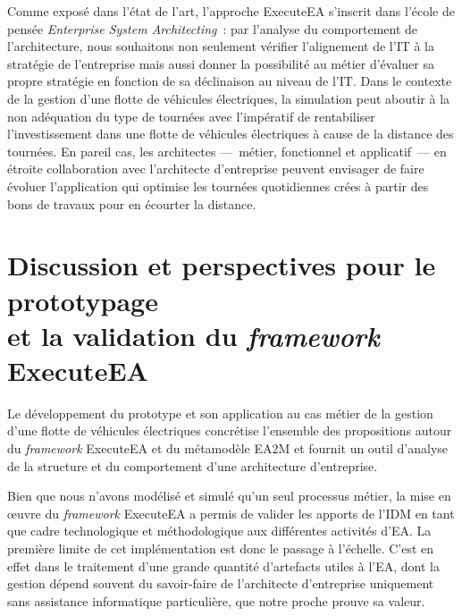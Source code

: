 Comme exposé dans l'état de l'art, l'approche ExecuteEA s'inscrit dans l'école
de pensée \emph{Enterprise System Architecting}~: par l'analyse du comportement
de l'architecture, nous souhaitons non seulement vérifier l'alignement de l'IT à
la stratégie de l'entreprise mais aussi donner la possibilité au métier
d'évaluer sa propre stratégie en fonction de sa déclinaison au niveau de l'IT.
Dans le contexte de la gestion d'une flotte de véhicules électriques, la
simulation peut aboutir à la non adéquation du type de tournées avec l'impératif
de rentabiliser l'investissement dans une flotte de véhicules électriques à
cause de la distance des tournées. En pareil cas, les architectes —~métier,
fonctionnel et applicatif~— en étroite collaboration avec l'architecte
d'entreprise peuvent envisager de faire évoluer l'application qui optimise les tournées quotidiennes 
crées à partir des bons de travaux pour en écourter la distance.




 
%

\section[Discussion et perspectives]{Discussion et perspectives pour le prototypage\\
            et la validation du \emph{framework} ExecuteEA}

    Le développement du prototype et son application au cas métier
    de la gestion d'une flotte de véhicules électriques concrétise l'ensemble des
    propositions autour du \emph{framework} ExecuteEA et du métamodèle EA2M
    et fournit un outil d'analyse de la structure et du comportement
    d'une architecture d'entreprise.

    Bien que nous n'avons modélisé et simulé qu'un seul processus métier, la mise
    en œuvre du \emph{framework} ExecuteEA a permis de valider les apports de l'IDM
    en tant que cadre technologique et méthodologique aux différentes activités d'EA.
    La première limite de cet implémentation est donc le passage à l'échelle. C'est en effet dans le
    traitement d'une grande quantité d'artefacts utiles à l'EA, dont la gestion dépend souvent du 
    savoir-faire de l'architecte d'entreprise uniquement
    sans assistance informatique particulière, que notre  proche prouve sa valeur.

